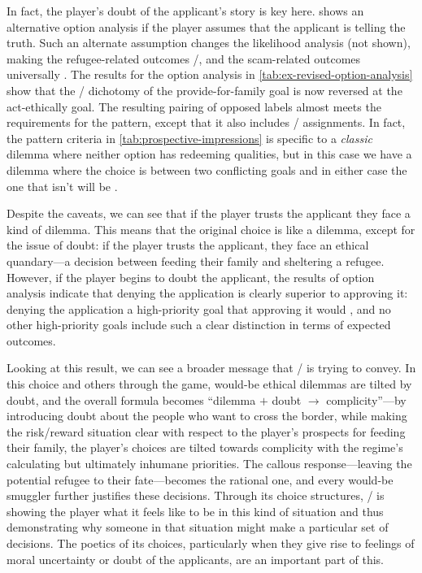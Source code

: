 In fact, the player's doubt of the applicant's story is key here.
%
 shows an alternative option analysis if the player assumes that the applicant is telling the truth.
%
Such an alternate assumption changes the likelihood analysis (not shown), making the refugee-related outcomes /, and the scam-related outcomes universally .
%
The results for the option analysis in \cref{tab:ex-revised-option-analysis} show that the / dichotomy of the provide-for-family goal is now reversed at the act-ethically goal.
%
The resulting pairing of opposed  labels almost meets the requirements for the  pattern, except that it also includes / assignments.
%
In fact, the  pattern criteria in \cref{tab:prospective-impressions} is specific to a \emph{classic} dilemma where neither option has redeeming qualities, but in this case we have a dilemma where the choice is between two conflicting goals and in either case the one that isn't  will be .


Despite the caveats, we can see that if the player trusts the applicant they face a kind of dilemma.
%
This means that the original choice is like a dilemma, except for the issue of doubt: if the player trusts the applicant, they face an ethical quandary---a decision between feeding their family and sheltering a refugee.
%
However, if the player begins to doubt the applicant, the results of option analysis indicate that denying the application is clearly superior to approving it: denying the application  a high-priority goal that approving it would , and no other high-priority goals include such a clear distinction in terms of expected outcomes.


Looking at this result, we can see a broader message that \papersplease/ is trying to convey.
%
In this choice and others through the game, would-be ethical dilemmas are tilted by doubt, and the overall formula becomes ``dilemma $+$ doubt $\rightarrow$ complicity''---by introducing doubt about the people who want to cross the border, while making the risk/reward situation clear with respect to the player's prospects for feeding their family, the player's choices are tilted towards complicity with the regime's calculating but ultimately inhumane priorities.
%
The callous response---leaving the potential refugee to their fate---becomes the rational one, and every would-be smuggler further justifies these decisions.
%
Through its choice structures, \papersplease/ is showing the player what it feels like to be in this kind of situation and thus demonstrating why someone in that situation might make a particular set of decisions.
%
The poetics of its choices, particularly when they give rise to feelings of moral uncertainty or doubt of the applicants, are an important part of this.


